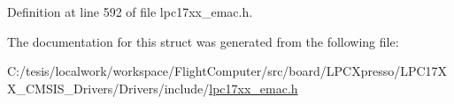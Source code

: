 \-Definition at line 592 of file lpc17xx\-\_\-emac.\-h.



\-The documentation for this struct was generated from the following file\-:\begin{DoxyCompactItemize}
\item 
\-C\-:/tesis/localwork/workspace/\-Flight\-Computer/src/board/\-L\-P\-C\-Xpresso/\-L\-P\-C17\-X\-X\-\_\-\-C\-M\-S\-I\-S\-\_\-\-Drivers/\-Drivers/include/\hyperlink{lpc17xx__emac_8h}{lpc17xx\-\_\-emac.\-h}\end{DoxyCompactItemize}
